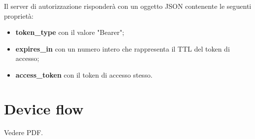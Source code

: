 \noindent Il server di autorizzazione risponderà con un oggetto JSON contenente le seguenti proprietà:
\begin{itemize}
    \item \textbf{token\_type} con il valore "Bearer";
    \item \textbf{expires\_in} con un numero intero che rappresenta il TTL del token di accesso;
    \item \textbf{access\_token} con il token di accesso stesso.
\end{itemize}

\section{Device flow}
Vedere PDF.



































 
